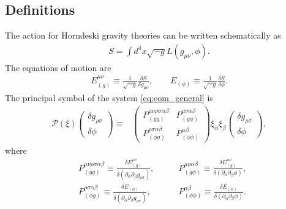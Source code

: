 \documentclass{ws-ijmpd}
\begin{document}
\subsection{Definitions}
The action for Horndeski gravity theories can be written schematically as
\begin{align}
   S
   =
   \int d^4x\sqrt{-g}L\left(g_{\mu\nu},\phi\right)
   .
\end{align}
The equations of motion are
\begin{align}
   \label{eq:eom_general}
   E^{\mu\nu}_{(g)}
   \equiv
   \frac{1}{\sqrt{-g}}\frac{\delta S}{\delta g_{\mu\nu}}
   ,\qquad
   E_{(\phi)}
   \equiv
   \frac{1}{\sqrt{-g}}\frac{\delta S}{\delta\phi}
   .
\end{align}
The principal symbol of the system \eqref{eq:eom_general} is
\begin{align}
\label{eq:definitions_principal_symbol}
   \mathcal{P}\left(\xi\right)
   \begin{pmatrix}
      \delta g_{\rho\sigma} 
      \\
      \delta\phi
   \end{pmatrix}
   \equiv&
   \begin{pmatrix}
      P^{\mu\nu\rho\sigma\alpha\beta}_{(gg)}
      &
      P_{(g\phi)}^{\mu\nu\alpha\beta}
      \\
      P^{\rho\sigma\alpha\beta}_{(\phi g)}
      &
      P^{\alpha\beta}_{(\phi\phi)}
   \end{pmatrix}
   \xi_{\alpha}\xi_{\beta}
   \begin{pmatrix}
      \delta g_{\rho\sigma} 
      \\
      \delta\phi
   \end{pmatrix}
   ,
\end{align}
where
\begin{subequations}
\begin{align}
   &P^{\mu\nu\rho\sigma\alpha\beta}_{(gg)}
   \equiv
   \frac{
      \delta E_{(g)}^{\mu\nu}
   }{
      \delta\left(\partial_{\alpha}\partial_{\beta}g_{\rho\sigma}\right)
   }
   ,\qquad
   &P_{(g\phi)}^{\mu\nu\alpha\beta}
   \equiv
   \frac{
      \delta E_{(g)}^{\mu\nu}
   }{
      \delta\left(\partial_{\alpha}\partial_{\beta}\phi\right)
   }
   ,\nonumber\\
   &P^{\rho\sigma\alpha\beta}_{(\phi g)}
   \equiv
   \frac{
      \delta E_{(\phi)}
   }{
      \delta\left(\partial_{\alpha}\partial_{\beta}g_{\rho\sigma}\right)
   }
   ,
   &P^{\alpha\beta}_{(\phi\phi)}
   \equiv
   \frac{
      \delta E_{(\phi)}
   }{
      \delta\left(\partial_{\alpha}\partial_{\beta}\phi\right)
   }
   .\nonumber
\end{align}
\end{subequations}
\end{document}
